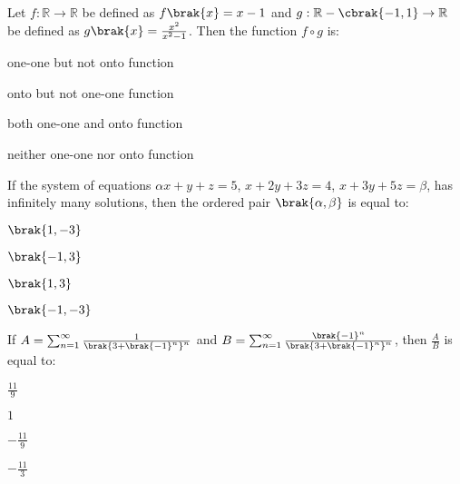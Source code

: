 \iffalse
\title{2022}
\author{EE24Btech11024 - G. Abhimanyu Koushik}
\section{mcq-single}
\fi

\item Let $f:\mathbb{R}\rightarrow\mathbb{R}$ be defined as $f\brak{x}=x-1$ and $g:\mathbb{R}-\cbrak{-1,1}\rightarrow\mathbb{R}$ be defined as $g\brak{x}=\frac{x^2}{x^2-1}$. Then the function $f\circ g$ is:

\hfill{}
\begin{enumerate}
\begin{multicols}{2}
\item one-one but not onto function
\item onto but not one-one function
\item both one-one and onto function
\item neither one-one nor onto function
\end{multicols}
\end{enumerate}


\item If the system of equations $\alpha x+y+z=5$, $x+2y+3z=4$, $x+3y+5z=\beta$, has infinitely many solutions, then the ordered pair $\brak{\alpha,\beta}$ is equal to:

\hfill{}
\begin{enumerate}
\begin{multicols}{4}
\item $\brak{1,-3}$
\item $\brak{-1,3}$
\item $\brak{1,3}$
\item $\brak{-1,-3}$
\end{multicols}
\end{enumerate}

\item If $A = \sum_{n=1}^{\infty}\frac{1}{\brak{3+\brak{-1}^n}^n}$ and $B = \sum_{n=1}^{\infty}\frac{\brak{-1}^n}{\brak{3+\brak{-1}^n}^n}$, then $\frac{A}{B}$ is equal to:

\hfill{}
\begin{enumerate}
\begin{multicols}{4}
\item $\frac{11}{9}$
\item $1$
\item $-\frac{11}{9}$
\item $-\frac{11}{3}$
\end{multicols}
\end{enumerate}


